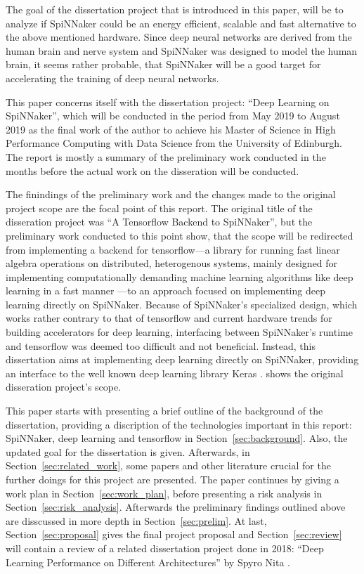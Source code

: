 \documentclass{article}
\begin{document}
The goal of the dissertation project that is introduced in
this paper, will be to analyze if SpiNNaker could be an
energy efficient, scalable and fast alternative to the
above mentioned hardware.
Since deep neural networks are derived from the human
brain and nerve system \citep{goodfellow2016} and SpiNNaker
was designed to model the human brain, it seems rather
probable, that SpiNNaker will be a good target for
accelerating the training of deep neural networks.

This paper concerns itself with the dissertation project:
``Deep Learning on SpiNNaker'', which will be conducted in
the period from May 2019 to August 2019 as the final work
of the author to achieve his Master of Science in
High Performance Computing with Data Science from the
University of Edinburgh.
The report is mostly a summary of the preliminary work
conducted in the months before the actual work on the
disseration will be conducted.

The finindings of the preliminary work and the changes made
to the original project scope are the focal point of this
report.
The original title of the disseration project was ``A
Tensorflow Backend to SpiNNaker'', but the preliminary work
conducted to this point show, that the scope will be
redirected from implementing a backend for tensorflow---a
library for running fast linear algebra operations on
distributed, heterogenous systems, mainly designed for
implementing computationally demanding machine learning
algorithms like deep learning in a fast manner
\citep{tf2015}---to an approach focused on implementing
deep learning directly on SpiNNaker.
Because of SpiNNaker's specialized design, which works
rather contrary to that of tensorflow and current hardware
trends for building accelerators for deep learning,
interfacing between SpiNNaker's runtime and tensorflow was
deemed too difficult and not beneficial.
Instead, this dissertation aims at implementing deep
learning directly on SpiNNaker, providing an interface to
the well known deep learning library Keras \citep{keras}.
\citet{proj} shows the original disseration project's
scope.

This paper starts with presenting a brief outline of the
background of the dissertation, providing a discription of
the technologies important in this report: SpiNNaker, deep
learning and tensorflow in Section~\ref{sec:background}.
Also, the updated goal for the dissertation is given.
Afterwards, in Section~\ref{sec:related_work}, some
papers and other literature crucial for the further doings
for this project are presented.
The paper continues by giving a work plan in
Section~\ref{sec:work_plan}, before presenting a risk
analysis in Section~\ref{sec:risk_analysis}.
Afterwards the preliminary findings outlined above are
disscussed in more depth in Section~\ref{sec:prelim}.
At last, Section~\ref{sec:proposal} gives the final
project proposal and Section~\ref{sec:review} will contain
a review of a related dissertation project done in 2018:
``Deep Learning Performance on Different Architectures'' by
Spyro Nita \citep{nita_2018}.
\end{document}
